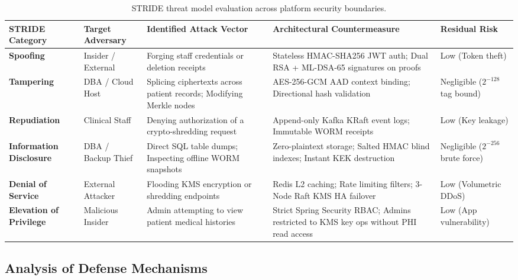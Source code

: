 \begin{table}[H]
    \centering
    \small
    \caption{STRIDE threat model evaluation across platform security boundaries.}
    \label{tab:stride-matrix}
    \begin{tabular}{p{2.2cm} p{2.2cm} p{3.6cm} p{4.2cm} p{1.8cm}}
        \toprule
        \textbf{STRIDE Category} & \textbf{Target Adversary} & \textbf{Identified Attack Vector} & \textbf{Architectural Countermeasure} & \textbf{Residual Risk} \\
        \midrule
        \textbf{Spoofing} & Insider / External & Forging staff credentials or deletion receipts & Stateless HMAC-SHA256 JWT auth; Dual RSA + ML-DSA-65 signatures on proofs & Low (Token theft) \\
        \addlinespace[4pt]
        \textbf{Tampering} & DBA / Cloud Host & Splicing ciphertexts across patient records; Modifying Merkle nodes & AES-256-GCM AAD context binding; Directional hash validation & Negligible ($2^{-128}$ tag bound) \\
        \addlinespace[4pt]
        \textbf{Repudiation} & Clinical Staff & Denying authorization of a crypto-shredding request & Append-only Kafka KRaft event logs; Immutable WORM receipts & Low (Key leakage) \\
        \addlinespace[4pt]
        \textbf{Information Disclosure} & DBA / Backup Thief & Direct SQL table dumps; Inspecting offline WORM snapshots & Zero-plaintext storage; Salted HMAC blind indexes; Instant KEK destruction & Negligible ($2^{-256}$ brute force) \\
        \addlinespace[4pt]
        \textbf{Denial of Service} & External Attacker & Flooding KMS encryption or shredding endpoints & Redis L2 caching; Rate limiting filters; 3-Node Raft KMS HA failover & Low (Volumetric DDoS) \\
        \addlinespace[4pt]
        \textbf{Elevation of Privilege} & Malicious Insider & Admin attempting to view patient medical histories & Strict Spring Security RBAC; Admins restricted to KMS key ops without PHI read access & Low (App vulnerability) \\
        \bottomrule
    \end{tabular}
\end{table}

\subsection{Analysis of Defense Mechanisms}


